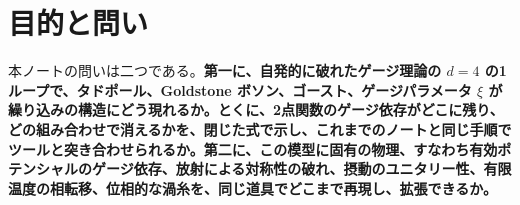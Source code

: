 \documentclass[a4paper,10pt]{ltjsarticle}
\newcommand{\MSbar}{\overline{\mathrm{MS}}}
\begin{document}
\begin{abstract}
と、Coleman--Weinberg の処方の $\lambda=\frac{33}{8\pi^2}e^4$ を本ノートの $\MSbar$ の式から再現した。すべての質量が $\phi^2$ に比例することから1ループの比を閉じた式で求め、そのゲージ依存が次の次数の $\pm\frac23\xi e^2/K$ であることを、5個のゲージの数値の最小点と $10^{-25}$ 以内で確かめた。CosmoTransitions の $V_1$ は $2\times10^{-15}$ で一致した。繰り込み群で $\mu=M_A$ まで走らせると比は $3e(M_A)^2/(8\pi^2)$ になり、大きな対数（$\tau_0=12$）を残した1ループの式とは $\ln v$ が $2.0$ 違った。手順 (9) では、縦波のゲージ場とヒッグス粒子の結合したチャンネル（$A_LA_L$、$hh$、$A_Lh$）の部分波を求めた。新しい $Ah\to Ah$ の振幅を含む4個の縦波の振幅は、FeynArts の模型（一般の $R_\xi$ ゲージ）と記号として、MadGraph の偏極の指定による行列要素と $5\times10^{-13}$ 以内で一致した。高エネルギーの $\lambda$ の部分の固有値は $-\lambda/(4\pi)$（電荷0）と $-\lambda/(8\pi)$（電荷2）で、木の限界 $\lambda\le2\pi$ を与える。ゲージ場の交換は前方の極から $-\frac{e^2}{8\pi}\ln s$ を加え、$e=\frac12$ では限界の $M_h/M_A$ が $\sqrt{4\pi}/e$ から最大13\%動く。1ループでは $a^{(1)}=(a^{(0)})^2(\frac{13}{2\pi}+i)$（電荷0）で、補正は $\lambda\simeq5.5$ で木と同じ大きさになる。手順 (10) では、有限温度の相転移を調べた。温度ポテンシャルは一般形 $D(T^2-T_0^2)\phi^2-ET\phi^3+\frac{\lambda_T}4\phi^4$ になり、$D=(4\lambda+3e^2)/24$、$E=e^3/(4\pi)$ で、縦波の Debye 遮蔽で $E\to\frac23E$ となる。DRalgo の次元簡約は、熱質量、Debye 質量、4次元の $\beta$ 関数を再現し、硬いモードの場の規格化を含めて再和した1ループのポテンシャルに記号として一致した。CosmoTransitions の臨界温度は $4\times10^{-5}$ 以内で一致した。再和したポテンシャルの $\phi_c/T_c$ のゲージ依存は、$\lambda=e^3/4$ を保つと背景場の $R_\xi$ ゲージで $e^2$、Fermi ゲージで $e^{3/4}$ で小さくなる。手順 (11) では、Abrikosov--Nielsen--Olesen の渦糸を $n=1,2,3$、$\beta=M_h^2/M_A^2=0.05$〜$10^4$ で求めた。$\beta=1$ で張力 $\pi v^2|n|$ が $10^{-11}$ 以内で成り立ち、$\mathcal T(n)/n$ の大小が $\beta=1$ で入れ替わる（第一種と第二種の境界）ことを確かめた。ビリアルの関係、遠方の減衰、大きな $\beta$ での $\frac{n^2}2\ln\beta$ の増え方も確かめ、選点法と張力の直接の最小化の二つの方法は $10^{-7}$ 以内で一致した。導出は付録に載せる。
\end{abstract}

\tableofcontents

\section{目的と問い}\label{sec:intro}

本ノートの問いは二つである。\textbf{第一に、自発的に破れたゲージ理論の $d=4$ の1ループで、タドポール、Goldstone ボソン、ゴースト、ゲージパラメータ $\xi$ が繰り込みの構造にどう現れるか。とくに、2点関数のゲージ依存がどこに残り、どの組み合わせで消えるかを、閉じた式で示し、これまでのノートと同じ手順でツールと突き合わせられるか。第二に、この模型に固有の物理、すなわち有効ポテンシャルのゲージ依存、放射による対称性の破れ、摂動のユニタリー性、有限温度の相転移、位相的な渦糸を、同じ道具でどこまで再現し、拡張できるか。}
\end{document}
